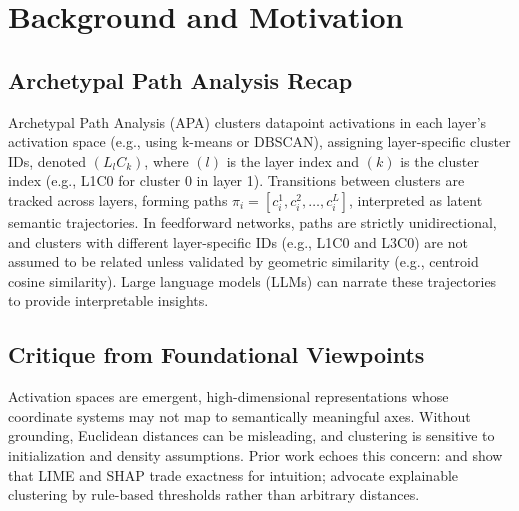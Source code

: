 \section{Background and Motivation}

\subsection{Archetypal Path Analysis Recap}

Archetypal Path Analysis (APA) clusters datapoint activations in each layer's activation space (e.g., using k-means or DBSCAN), assigning layer-specific cluster IDs, denoted $(L_lC_k)$, where $(l)$ is the layer index and $(k)$ is the cluster index (e.g., L1C0 for cluster 0 in layer 1). Transitions between clusters are tracked across layers, forming paths $\pi_i = [c_i^1, c_i^2, \dots, c_i^L]$, interpreted as latent semantic trajectories. In feedforward networks, paths are strictly unidirectional, and clusters with different layer-specific IDs (e.g., L1C0 and L3C0) are not assumed to be related unless validated by geometric similarity (e.g., centroid cosine similarity). Large language models (LLMs) can narrate these trajectories to provide interpretable insights.

\subsection{Critique from Foundational Viewpoints}

Activation spaces are emergent, high-dimensional representations whose coordinate systems may not map to semantically meaningful axes. Without grounding, Euclidean distances can be misleading, and clustering is sensitive to initialization and density assumptions. Prior work echoes this concern: \citet{ribeiro2016} and \citet{lundberg2017} show that LIME and SHAP trade exactness for intuition; \citet{dasgupta2020} advocate explainable clustering by rule-based thresholds rather than arbitrary distances.